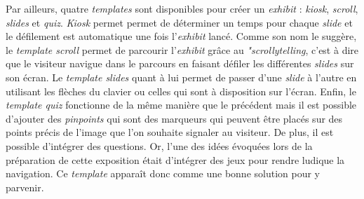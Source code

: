     Par ailleurs, quatre \textit{templates} sont disponibles pour créer un \textit{exhibit} : \textit{kiosk}, \textit{scroll}, \textit{slides} et \textit{quiz}. \textit{Kiosk} permet permet de déterminer un temps pour chaque \textit{slide} et le défilement est automatique une fois l'\textit{exhibit} lancé. Comme son nom le suggère, le \textit{template scroll} permet de parcourir l'\textit{exhibit} grâce au \textit{"scrollytelling}, c'est à dire que le visiteur navigue dans le parcours en faisant défiler les différentes \textit{slides} sur son écran. Le \textit{template slides} quant à lui permet de passer d'une \textit{slide} à l'autre en utilisant les flèches du clavier ou celles qui sont à disposition sur l'écran. Enfin, le \textit{template quiz} fonctionne de la même manière que le précédent mais il est possible d'ajouter des \textit{pinpoints} qui sont des marqueurs qui peuvent être placés sur des points précis de l'image que l'on souhaite signaler au visiteur. De plus, il est possible d'intégrer des questions. Or, l'une des idées évoquées lors de la préparation de cette exposition était d'intégrer des jeux pour rendre ludique la navigation. Ce \textit{template} apparaît donc comme une bonne solution pour y parvenir.
    
